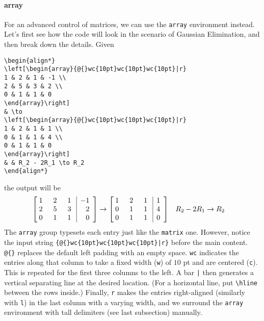 \paragraph{array}
For an advanced control of matrices, we can use the \verb|array| environment instead. Let's first see how the code will look in the scenario of Gaussian Elimination, and then break down the details. Given
\begin{lstlisting}
\begin{align*}
\left[\begin{array}{@{}wc{10pt}wc{10pt}wc{10pt}|r}
1 & 2 & 1 & -1 \\
2 & 5 & 3 & 2 \\
0 & 1 & 1 & 0
\end{array}\right] 
& \to 
\left[\begin{array}{@{}wc{10pt}wc{10pt}wc{10pt}|r}
1 & 2 & 1 & 1 \\
0 & 1 & 1 & 4 \\
0 & 1 & 1 & 0
\end{array}\right] 
& & R_2 - 2R_1 \to R_2
\end{align*}    
\end{lstlisting}
the output will be
\begin{align*}
\left[\begin{array}{@{}wc{10pt}wc{10pt}wc{10pt}|r}
1 & 2 & 1 & -1 \\
2 & 5 & 3 & 2 \\
0 & 1 & 1 & 0
\end{array}\right] 
& \to 
\left[\begin{array}{@{}wc{10pt}wc{10pt}wc{10pt}|r}
1 & 2 & 1 & 1 \\
0 & 1 & 1 & 4 \\
0 & 1 & 1 & 0
\end{array}\right] 
& & R_2 - 2R_1 \to R_2
\end{align*}
The \verb|array| group typesets each entry just like the \verb|matrix| one. However, notice the input string \texttt{\{@\{\}wc\{10pt\}wc\{10pt\}wc\{10pt\}|r\}} before the main content. \texttt{@\{\}} replaces the default left padding with an empty space. \texttt{wc} indicates the entries along that column to take a fixed width (\verb|w|) of $10$ pt and are centered (\verb|c|). This is repeated for the first three columns to the left. A bar \texttt{|} then generates a vertical separating line at the desired location. (For a horizontal line, put \texttt{\textbackslash hline} between the rows inside.) Finally, \texttt{r} makes the entries right-aligned (similarly with \verb|l|) in the last column with a varying width, and we surround the \verb|array| environment with tall delimiters (see last subsection) manually.

